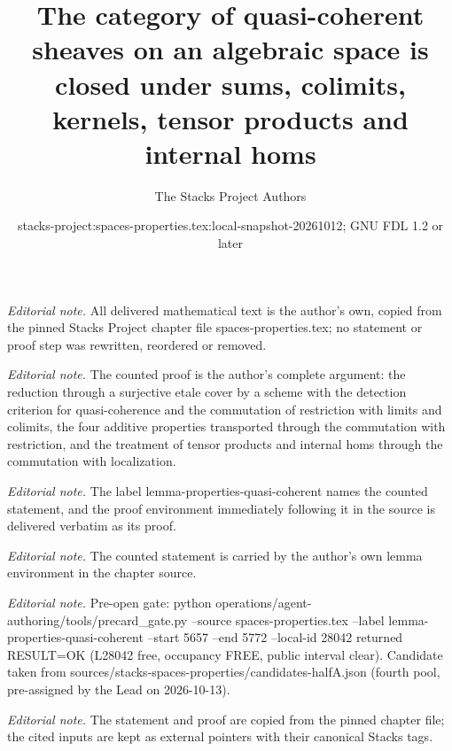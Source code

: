 \documentclass[10pt,a4paper]{amsart}
\title{The category of quasi-coherent sheaves on an algebraic space is closed under sums, colimits, kernels, tensor products and internal homs}
\author{The Stacks Project Authors}
\date{stacks-project:spaces-properties.tex:local-snapshot-20261012; GNU FDL 1.2 or later}
\theoremstyle{plain}
\theoremstyle{definition}
\theoremstyle{remark}
\numberwithin{equation}{subsection}
\begin{document}
\maketitle
\noindent\textit{Editorial note.} All delivered mathematical text is the author's own, copied from the pinned Stacks Project chapter file spaces-properties.tex; no statement or proof step was rewritten, reordered or removed.\par\medskip
\noindent\textit{Editorial note.} The counted proof is the author's complete argument: the reduction through a surjective etale cover by a scheme with the detection criterion for quasi-coherence and the commutation of restriction with limits and colimits, the four additive properties transported through the commutation with restriction, and the treatment of tensor products and internal homs through the commutation with localization.\par\medskip
\noindent\textit{Editorial note.} The label lemma-properties-quasi-coherent names the counted statement, and the proof environment immediately following it in the source is delivered verbatim as its proof.\par\medskip
\noindent\textit{Editorial note.} The counted statement is carried by the author's own lemma environment in the chapter source.\par\medskip
\noindent\textit{Editorial note.} Pre-open gate: python operations/agent-authoring/tools/precard\_gate.py --source spaces-properties.tex --label lemma-properties-quasi-coherent --start 5657 --end 5772 --local-id 28042 returned RESULT=OK (L28042 free, occupancy FREE, public interval clear). Candidate taken from sources/stacks-spaces-properties/candidates-halfA.json (fourth pool, pre-assigned by the Lead on 2026-10-13).\par\medskip
\noindent\textit{Editorial note.} The statement and proof are copied from the pinned chapter file; the cited inputs are kept as external pointers with their canonical Stacks tags.\par\medskip
\end{document}
